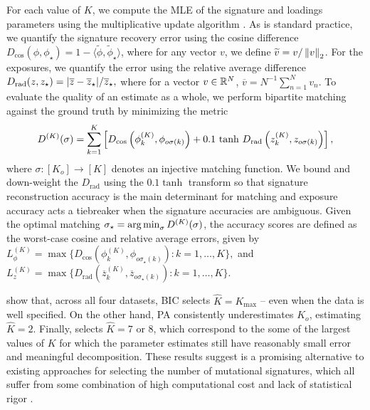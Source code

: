 For each value of $K$, we compute the MLE of the signature and loadings parameters using the multiplicative update algorithm %
\citep{Lee-Seung_multdiv_2000}.
As is standard practice, we quantify the signature recovery error using the cosine difference $
	D_{\mathrm{cos}}({\phi},{\phi}_{\star})=1-\langle {\widetilde\phi},{\widetilde\phi}_{\star} \rangle$, where for any vector ${v}$, we define ${\widetilde v} = {v} / \left\|{{v}}\right\|_{2}$.
For the exposures, we quantify the error using the relative average difference
$
	D_{\mathrm{rad}}({z}, {z}_{\star})= {\left\lvert \overline{z}-\overline{z}_{\star}\right\rvert}/{\overline{z}_{\star}},
$
where for a vector ${v} \in \mathbb{R}^N$, $\overline{v} = N^{-1}\sum_{n=1}^N v_n$.
To evaluate the quality of an estimate as a whole, we perform bipartite matching against the ground truth by minimizing the metric
\[
	D^{(K)}(\sigma)=\sum^{K}_{k=1}\left[D_{\mathrm{cos}}\left({\phi}^{(K)}_{k},{\phi}_{o\sigma(k)}\right)
		+0.1\, \tanh\, D_{\mathrm{rad}}\left({z}^{(K)}_{k},{z}_{o\sigma(k)}\right)\right],
\]
where $\sigma \colon [K_o] \to [K]$ denotes an injective matching function.
We bound and down-weight the $D_{\mathrm{rad}}$ using the $0.1 \tanh$ transform so that signature reconstruction accuracy is the main determinant for matching 
and exposure accuracy acts a tiebreaker when the signature accuracies are ambiguous. 
Given the optimal matching $\sigma_{\star} = \argmin_\sigma D^{(K)}(\sigma)$, the accuracy scores are defined
as the worst-case cosine and relative average errors, given by
$
	L^{(K)}_{{\phi}} = \max\{D_{\mathrm{cos}}({\phi}^{(K)}_{k},{\phi}_{o\sigma_{\star}(k)}) : k=1,\dots,K \},
$
and
$
	L^{(K)}_{z} = \max\{D_{\mathrm{rad}}(\overline{z}^{(K)}_{k},\overline{z}_{o\sigma_{\star}(k)}) :  k=1,\dots,K\}.
$

 show that, across all four datasets,
BIC selects $\widehat{K} = K_{\max}$ -- even when the data is well specified.
On the other hand, PA consistently underestimates $K_o$, estimating $\hat K = 2$. Finally, \methodname selects $\widehat K = 7$ or $8$, which correspond to the some of the largest values of $K$ for which the parameter estimates still have reasonably small error and meaningful decomposition.
These results suggest \methodname is a promising alternative to existing approaches for selecting the number of mutational signatures, which all suffer from some combination of high computational cost and lack of statistical rigor \citep{Xue:2024,pcawg2020}.

